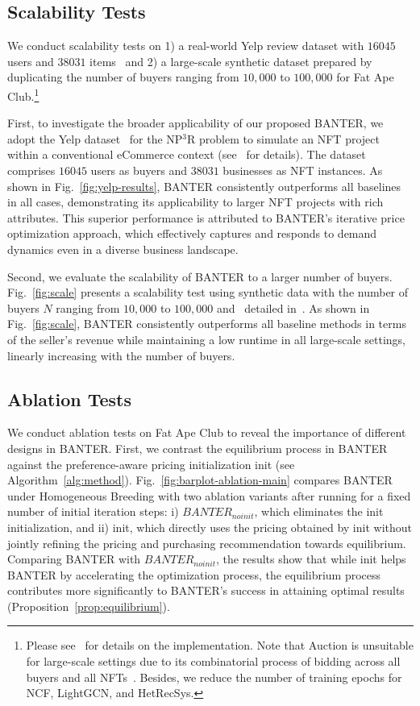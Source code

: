 \documentclass[conference]{IEEEtran}
\theoremstyle{plain}
\begin{document}
\subsection{Scalability Tests}
\label{subsec:scale}
We conduct scalability tests on 1) a real-world Yelp review dataset with $16045$ users and $38031$ items~\cite{yelp_dataset} and 2) a large-scale synthetic dataset prepared by duplicating the number of buyers ranging from $10,000$ to $100,000$ for Fat Ape Club.\footnote{Please see~\cite{supplementary} for details on the implementation. Note that Auction is unsuitable for large-scale settings due to its combinatorial process of bidding across all buyers and all NFTs~\cite{garg2004auction}. Besides, we reduce the number of training epochs for NCF, LightGCN, and HetRecSys.}

First, to investigate the broader applicability of our proposed BANTER, we adopt the Yelp dataset~\cite{yelp_dataset} for the NP$^3$R problem to simulate an NFT project within a conventional eCommerce context (see~\cite{supplementary} for details). The dataset comprises $16045$ users as buyers and $38031$ businesses as NFT instances. As shown in Fig.~\ref{fig:yelp-results}, BANTER consistently outperforms all baselines in all cases, demonstrating its applicability to larger NFT projects with rich attributes. This superior performance is attributed to BANTER's iterative price optimization approach, which effectively captures and responds to demand dynamics even in a diverse business landscape.

Second, we evaluate the scalability of BANTER to a larger number of buyers.
Fig.~\ref{fig:scale} presents a scalability test using synthetic data with the number of buyers $N$ ranging from $10,000$ to $100,000$ and~\cite{bendre2018towards} detailed in~\cite{supplementary}.  As shown in Fig.~\ref{fig:scale}, BANTER consistently outperforms all baseline methods in terms of the seller's revenue while maintaining a low runtime in all large-scale settings, linearly increasing with the number of buyers.  

\subsection{Ablation Tests}
\label{subsec:ablation_tests}
We conduct ablation tests on Fat Ape Club to reveal the importance of different designs in BANTER. First, we contrast the equilibrium process in BANTER against the preference-aware pricing initialization init (see Algorithm~\ref{alg:method}). Fig.~\ref{fig:barplot-ablation-main} compares BANTER under Homogeneous Breeding with two ablation variants after running for a fixed number of initial iteration steps: i) $BANTER _{no init}$, which eliminates the init initialization, and ii) init, which directly uses the pricing obtained by init without jointly refining the pricing and purchasing recommendation towards equilibrium. Comparing BANTER with $BANTER _{no init}$, the results show that while init helps BANTER by accelerating the optimization process, the equilibrium process contributes more significantly to BANTER's success in attaining optimal results (Proposition~\ref{prop:equilibrium}). 
\end{document}
